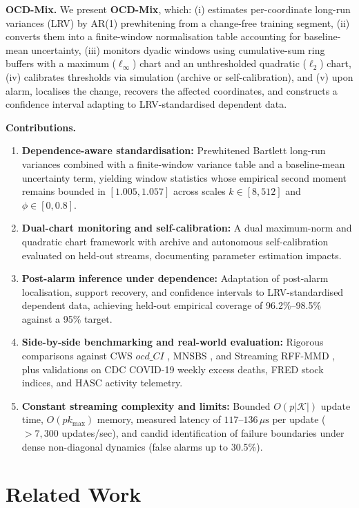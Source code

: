 \documentclass[lettersize,journal]{IEEEtran}
\begin{document}
\textbf{OCD-Mix.} We present \textbf{OCD-Mix}, which: (i) estimates per-coordinate long-run variances (LRV) by AR(1) prewhitening from a change-free training segment, (ii) converts them into a finite-window normalisation table accounting for baseline-mean uncertainty, (iii) monitors dyadic windows using cumulative-sum ring buffers with a maximum ($\ell_\infty$) chart and an unthresholded quadratic ($\ell_2$) chart, (iv) calibrates thresholds via simulation (archive or self-calibration), and (v) upon alarm, localises the change, recovers the affected coordinates, and constructs a confidence interval adapting \cite{chen2024high} to LRV-standardised dependent data.

\textbf{Contributions.}
\begin{enumerate}
    \item \textbf{Dependence-aware standardisation:} Prewhitened Bartlett long-run variances combined with a finite-window variance table and a baseline-mean uncertainty term, yielding window statistics whose empirical second moment remains bounded in $[1.005, 1.057]$ across scales $k \in [8, 512]$ and $\phi \in [0, 0.8]$.
    \item \textbf{Dual-chart monitoring and self-calibration:} A dual maximum-norm and quadratic chart framework with archive and autonomous self-calibration evaluated on held-out streams, documenting parameter estimation impacts.
    \item \textbf{Post-alarm inference under dependence:} Adaptation of post-alarm localisation, support recovery, and confidence intervals to LRV-standardised dependent data, achieving held-out empirical coverage of 96.2\%--98.5\% against a 95\% target.
    \item \textbf{Side-by-side benchmarking and real-world evaluation:} Rigorous comparisons against CWS $ocd\_CI$ \cite{chen2024high}, MNSBS \cite{madridpadilla2023nonparametric}, and Streaming RFF-MMD \cite{kalinke2025streaming}, plus validations on CDC COVID-19 weekly excess deaths, FRED stock indices, and HASC activity telemetry.
    \item \textbf{Constant streaming complexity and limits:} Bounded $O(p|\mathcal{K}|)$ update time, $O(pk_{\max})$ memory, measured latency of $117$--$136\,\mu\text{s}$ per update ($>7,300$ updates/sec), and candid identification of failure boundaries under dense non-diagonal dynamics (false alarms up to 30.5\%).
\end{enumerate}

\section{Related Work}
\end{document}
